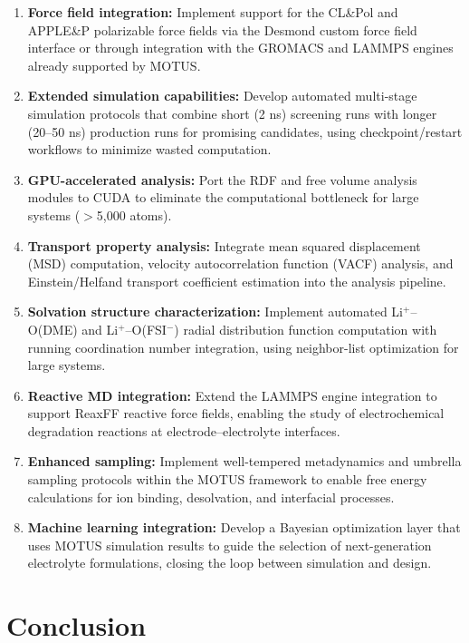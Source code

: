 \documentclass[twocolumn,10pt]{article}
\begin{document}
\begin{enumerate}[nosep]
    \item \textbf{Force field integration:} Implement support for the CL\&Pol and APPLE\&P polarizable force fields via the Desmond custom force field interface or through integration with the GROMACS and LAMMPS engines already supported by MOTUS.
    \item \textbf{Extended simulation capabilities:} Develop automated multi-stage simulation protocols that combine short (2 ns) screening runs with longer (20--50 ns) production runs for promising candidates, using checkpoint/restart workflows to minimize wasted computation.
    \item \textbf{GPU-accelerated analysis:} Port the RDF and free volume analysis modules to CUDA to eliminate the computational bottleneck for large systems ($>$5,000 atoms).
    \item \textbf{Transport property analysis:} Integrate mean squared displacement (MSD) computation, velocity autocorrelation function (VACF) analysis, and Einstein/Helfand transport coefficient estimation into the analysis pipeline.
    \item \textbf{Solvation structure characterization:} Implement automated Li$^+$--O(DME) and Li$^+$--O(FSI$^-$) radial distribution function computation with running coordination number integration, using neighbor-list optimization for large systems.
    \item \textbf{Reactive MD integration:} Extend the LAMMPS engine integration to support ReaxFF reactive force fields, enabling the study of electrochemical degradation reactions at electrode--electrolyte interfaces.
    \item \textbf{Enhanced sampling:} Implement well-tempered metadynamics and umbrella sampling protocols within the MOTUS framework to enable free energy calculations for ion binding, desolvation, and interfacial processes.
    \item \textbf{Machine learning integration:} Develop a Bayesian optimization layer that uses MOTUS simulation results to guide the selection of next-generation electrolyte formulations, closing the loop between simulation and design.
\end{enumerate}

\section{Conclusion}
\label{sec:conclusion}
\end{document}
